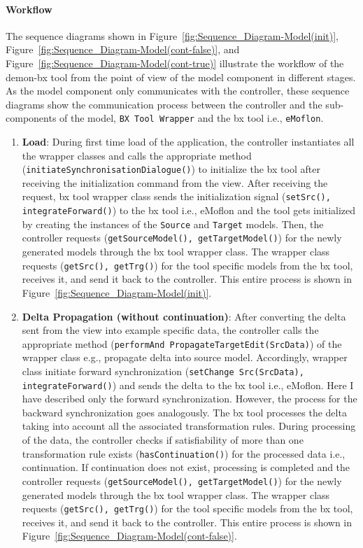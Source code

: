 \paragraph{Workflow}
The sequence diagrams shown in Figure~\ref{fig:Sequence_Diagram-Model(init)}, Figure~\ref{fig:Sequence_Diagram-Model(cont-false)}, and Figure~\ref{fig:Sequence_Diagram-Model(cont-true)} illustrate the workflow of the demon-bx tool from the point of view of the model component in different stages. As the model component only communicates with the controller, these sequence diagrams show the communication process between the controller and the sub-components of the model, \texttt{BX Tool Wrapper} and the bx tool i.e., \texttt{eMoflon}.
\begin{enumerate}
	\item {\textbf{Load}: During first time load of the application, the controller instantiates all the wrapper classes and calls the appropriate method (\texttt{initiateSynchronisationDialogue()}) to initialize the bx tool after receiving the initialization command from the view. After receiving the request, bx tool wrapper class sends the initialization signal (\texttt{setSrc(), integrateForward()}) to the bx tool i.e., eMoflon and the tool gets initialized by creating the instances of the \texttt{Source} and \texttt{Target} models. Then, the controller requests (\texttt{getSourceModel(), getTargetModel()}) for the newly generated models through the bx tool wrapper class. The wrapper class requests (\texttt{getSrc(), getTrg()}) for the tool specific models from the bx tool, receives it, and send it back to the controller. This entire process is shown in Figure~\ref{fig:Sequence_Diagram-Model(init)}.}
	
	\item {\textbf{Delta Propagation (without continuation)}: After converting the delta sent from the view into example specific data, the controller calls the appropriate method (\texttt{performAnd PropagateTargetEdit(SrcData)}) of the wrapper class e.g., propagate delta into source model. Accordingly, wrapper class initiate forward synchronization 
	(\texttt{setChange Src(SrcData), integrateForward()}) and sends the delta to the bx tool i.e., eMoflon. Here I have described only the forward synchronization. However, the process for the backward synchronization goes analogously. The bx tool processes the delta taking into account all the associated transformation rules. During processing of the data, the controller checks if satisfiability of more than one transformation rule exists (\texttt{hasContinuation()}) for the processed data i.e., continuation. If continuation does not exist, processing is completed and the controller requests (\texttt{getSourceModel(), getTargetModel()}) for the newly generated models through the bx tool wrapper class. The wrapper class requests (\texttt{getSrc(), getTrg()}) for the tool specific models from the bx tool, receives it, and send it back to the controller. This entire process is shown in Figure~\ref{fig:Sequence_Diagram-Model(cont-false)}.}
	

\end{enumerate}
